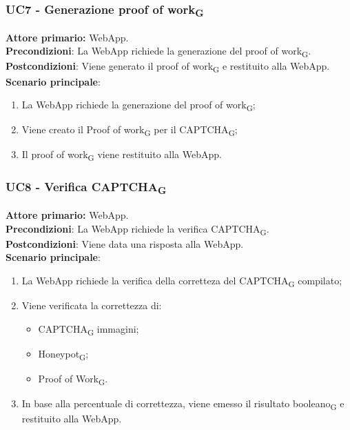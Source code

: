 \subsubsection{UC7  - Generazione proof of work\textsubscript{G}}
\textbf{Attore primario:} WebApp.\\
\textbf{Precondizioni}: La WebApp richiede la generazione del proof of work\textsubscript{G}.\\
\textbf{Postcondizioni}: Viene generato il proof of work\textsubscript{G} e restituito alla WebApp.\\

\textbf{Scenario principale}:
\begin{enumerate}
    \item La WebApp richiede la generazione del proof of work\textsubscript{G};
    \item Viene creato il Proof of work\textsubscript{G} per il CAPTCHA\textsubscript{G};
    \item Il proof of work\textsubscript{G} viene restituito alla WebApp.
\end{enumerate}

\subsubsection{UC8 - Verifica CAPTCHA\textsubscript{G}}
\textbf{Attore primario:} WebApp.\\
\textbf{Precondizioni}: La WebApp richiede la verifica CAPTCHA\textsubscript{G}.\\
\textbf{Postcondizioni}: Viene data una risposta alla WebApp.\\

\textbf{Scenario principale}:
\begin{enumerate}
    \item La WebApp richiede la verifica della corretteza del CAPTCHA\textsubscript{G} compilato;
    \item Viene verificata la correttezza di:
    \begin{itemize}
		\item CAPTCHA\textsubscript{G} immagini;
		\item Honeypot\textsubscript{G};
		\item Proof of Work\textsubscript{G}.
    \end{itemize}
    \item In base alla percentuale di correttezza, viene emesso il risultato booleano\textsubscript{G} e restituito alla WebApp.
\end{enumerate}

